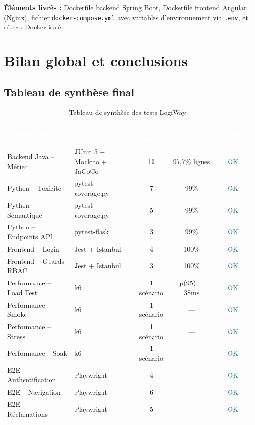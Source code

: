 \documentclass[12pt,a4paper]{report}
\newcommand{\thead}[1]{\cellcolor{tablehead}\textcolor{white}{\textbf{#1}}}
\begin{document}
\textbf{Éléments livrés :} Dockerfile backend Spring Boot, Dockerfile
frontend Angular (Nginx), fichier \texttt{docker-compose.yml} avec variables
d'environnement via \texttt{.env}, et réseau Docker isolé.

\section{Bilan global et conclusions}
\label{sec:ch9-bilan}

\subsection{Tableau de synthèse final}

\begin{table}[H]
  \centering
  \caption{Tableau de synthèse des tests LogiWay}
  \label{tab:tests_synthese}
  \begin{tabularx}{\textwidth}{|l|l|c|c|c|}
    \hline
    \thead{Couche testée} & \thead{Outil} & \thead{Nb. tests} & \thead{Couverture} & \thead{Résultat} \\
    \hline
    Backend Java -- Métier & JUnit 5 + Mockito + JaCoCo & 10 & 97,7\% lignes & \textcolor{teal}{OK} \\
    Python -- Toxicité & pytest + coverage.py & 7 & 99\% & \textcolor{teal}{OK} \\
    Python -- Sémantique & pytest + coverage.py & 5 & 99\% & \textcolor{teal}{OK} \\
    Python -- Endpoints API & pytest-flask & 3 & 99\% & \textcolor{teal}{OK} \\
    Frontend -- Login & Jest + Istanbul & 4 & 100\% & \textcolor{teal}{OK} \\
    Frontend -- Guards RBAC & Jest + Istanbul & 3 & 100\% & \textcolor{teal}{OK} \\
    Performance -- Load Test & k6 & 1 scénario & p(95) = 38ms & \textcolor{teal}{OK} \\
    Performance -- Smoke & k6 & 1 scénario & --- & \textcolor{teal}{OK} \\
    Performance -- Stress & k6 & 1 scénario & --- & \textcolor{teal}{OK} \\
    Performance -- Soak & k6 & 1 scénario & --- & \textcolor{teal}{OK} \\
    E2E -- Authentification & Playwright & 4 & --- & \textcolor{teal}{OK} \\
    E2E -- Navigation & Playwright & 6 & --- & \textcolor{teal}{OK} \\
    E2E -- Réclamations & Playwright & 5 & --- & \textcolor{teal}{OK} \\
    \hline
  \end{tabularx}
\end{table}
\end{document}
